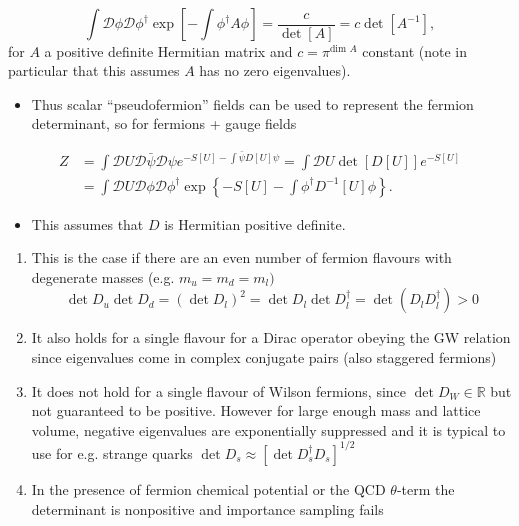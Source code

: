 \begin{equation}
    \int \mathcal{D}\phi \mathcal{D}\phi^\dagger \exp\left[-\int \phi^\dagger A \phi\right] = \frac{c}{\det[A]} = c \det[A^{-1}],
\end{equation}
for $A$ a positive definite Hermitian matrix and $c = \pi^{\text{dim }A}$ constant (note in particular that this assumes $A$ has no zero eigenvalues).
\begin{itemize}
    \item Thus scalar ``pseudofermion'' fields can be used to represent the fermion determinant, so for fermions + gauge fields
\end{itemize}
\begin{align}
    Z &= \int \mathcal{D}U\mathcal{D}\bar{\psi}\mathcal{D}\psi e^{-S[U] - \int \bar{\psi}D[U]\psi} = \int \mathcal{D}U \det[D[U]]e^{-S[U]} \nonumber \\
    &= \int \mathcal{D}U \mathcal{D}\phi \mathcal{D}\phi^\dagger \exp \left\{ -S[U] - \int \phi^\dagger D^{-1}[U]\phi \right\}.
\end{align}

\begin{itemize}
    \item This assumes that $D$ is Hermitian positive definite.
\end{itemize}
\begin{enumerate}
    \item This is the case if there are an even number of fermion flavours with degenerate masses (e.g. $m_u = m_d = m_l)$
    \begin{equation}
        \det D_u \det D_d = (\det D_l)^2 = \det D_l \det D_l^\dagger = \det(D_l D_l^\dagger) > 0
    \end{equation}
    \item It also holds for a single flavour for a Dirac operator obeying the GW relation since eigenvalues come in complex conjugate pairs (also staggered fermions)
    \item It does not hold for a single flavour of Wilson fermions, since $\det D_W \in \mathbb{R}$ but not guaranteed to be positive. However for large enough mass and lattice volume, negative eigenvalues are exponentially suppressed and it is typical to use for e.g. strange quarks $\det D_s \approx [\det D_s^\dagger D_s]^{1/2}$
    \item In the presence of fermion chemical potential or the QCD $\theta$-term the determinant is nonpositive and importance sampling fails
\end{enumerate}


